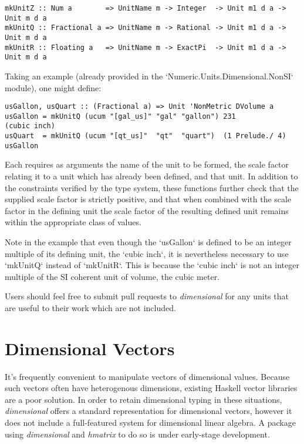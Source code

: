 \documentclass[11pt]{report}
\newcommand{\packagename}[1]{\textit{#1}}
\newcommand{\thispackage}{\packagename{dimensional}}
\begin{document}
\begin{lstlisting}
mkUnitZ :: Num a        => UnitName m -> Integer  -> Unit m1 d a -> Unit m d a
mkUnitQ :: Fractional a => UnitName m -> Rational -> Unit m1 d a -> Unit m d a
mkUnitR :: Floating a   => UnitName m -> ExactPi  -> Unit m1 d a -> Unit m d a
\end{lstlisting}

Taking an example (already provided in the `Numeric.Units.Dimensional.NonSI` module), one might define:

\begin{lstlisting}
usGallon, usQuart :: (Fractional a) => Unit 'NonMetric DVolume a
usGallon = mkUnitQ (ucum "[gal_us]" "gal" "gallon") 231             (cubic inch)
usQuart  = mkUnitQ (ucum "[qt_us]"  "qt"  "quart")  (1 Prelude./ 4) usGallon
\end{lstlisting}

Each requires as arguments the name of the unit to be formed, the scale factor relating it to a unit which has already been defined,
and that unit. In addition to the constraints verified by the type system, these functions further check that the supplied scale factor is
strictly positive, and that when combined with the scale factor in the defining unit the scale factor of the resulting defined unit remains
within the appropriate class of values.

Note in the example that even though the `usGallon` is defined to be an integer multiple of its defining unit, the `cubic inch`, it is nevertheless
necessary to use `mkUnitQ` instead of `mkUnitR`. This is because the `cubic inch` is not an integer multiple of the SI coherent unit of volume, the cubic meter.

Users should feel free to submit pull requests to \thispackage{} for any units that are useful to their work which are not included.




\chapter{Dimensional Vectors}

It's frequently convenient to manipulate vectors of dimensional values. Because such vectors often have heterogenous
dimensions, existing Haskell vector libraries are a poor solution. In order to retain dimensional typing in these situations,
\thispackage{} offers a standard representation for dimensional vectors, however it does not include a full-featured system for
dimensional linear algebra. A package using \thispackage{} and \packagename{hmatrix} to do so is under early-stage development.
\end{document}
